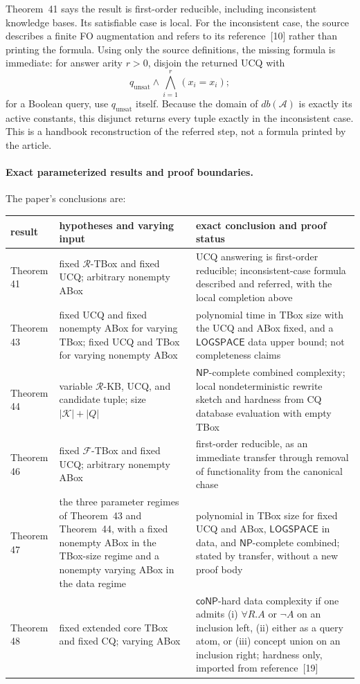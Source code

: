 Theorem~41 says the result is first-order reducible, including inconsistent
knowledge bases.  Its satisfiable case is local.  For the inconsistent case,
the source describes a finite FO augmentation and refers to its reference~[10]
rather than printing the formula.  Using only the source definitions, the
missing formula is immediate: for answer arity \(r>0\), disjoin the returned
UCQ with
\[
 q_{\mathrm{unsat}}\land\bigwedge_{i=1}^{r}(x_i=x_i);
\]
for a Boolean query, use \(q_{\mathrm{unsat}}\) itself.  Because the domain of
\(db(\mathcal A)\) is exactly its active constants, this disjunct returns every
tuple exactly in the inconsistent case.  This is a handbook reconstruction of
the referred step, not a formula printed by the article.

\paragraph{Exact parameterized results and proof boundaries.}
The paper's conclusions are:
\begin{center}
\small
\begin{tabularx}{\textwidth}{@{}l X X@{}}
\toprule
result & hypotheses and varying input & exact conclusion and proof status\\
\midrule
Theorem 41 & fixed \(\mathcal R\)-TBox and fixed UCQ; arbitrary nonempty ABox &
UCQ answering is first-order reducible; inconsistent-case formula described
and referred, with the local completion above\\
Theorem 43 & fixed UCQ and fixed nonempty ABox for varying TBox; fixed UCQ and
TBox for varying nonempty ABox &
polynomial time in TBox size with the UCQ and ABox fixed, and a
\(\mathsf{LOGSPACE}\) data upper bound; not completeness claims\\
Theorem 44 & variable \(\mathcal R\)-KB, UCQ, and candidate tuple; size
\(|\mathcal K|+|Q|\) & \(\mathsf{NP}\)-complete combined complexity; local
nondeterministic rewrite sketch and hardness from CQ database evaluation with
empty TBox\\
Theorem 46 & fixed \(\mathcal F\)-TBox and fixed UCQ; arbitrary nonempty ABox &
first-order reducible, as an immediate transfer through removal of functionality
from the canonical chase\\
Theorem 47 & the three parameter regimes of Theorem~43 and Theorem~44, with a
fixed nonempty ABox in the TBox-size regime and a nonempty varying ABox in the
data regime &
polynomial in TBox size for fixed UCQ and ABox, \(\mathsf{LOGSPACE}\) in data, and
\(\mathsf{NP}\)-complete combined; stated by transfer, without a new proof body\\
Theorem 48 & fixed extended core TBox and fixed CQ; varying ABox &
\(\mathsf{coNP}\)-hard data complexity if one admits (i) \(\forall R.A\) or
\(\neg A\) on an inclusion left, (ii) either as a query atom, or (iii) concept
union on an inclusion right; hardness only, imported from reference~[19]\\
\bottomrule
\end{tabularx}
\end{center}
